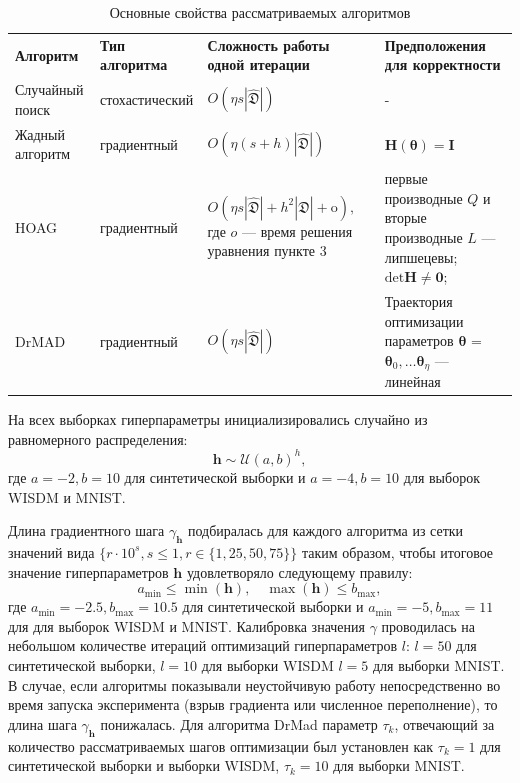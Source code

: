 \begin{table}
\small

\begin{tabularx}{\textwidth}{|X|X|X|X|}
\hline
\bf Алгоритм & \bf Тип алгоритма & \bf Сложность работы одной итерации & \bf Предположения для корректности  \\ 
Случайный поиск & стохастический & $O(\eta s |\hat{\mathfrak{D}}|)$& -  \\ \hline
Жадный алгоритм~\cite{greed_hyper} & градиентный & $O(\eta (s+h) |\hat{\mathfrak{D}}|)$ & $\mathbf{H}(\boldsymbol{\theta}) = \mathbf{I}$  \\ \hline
HOAG~\cite{hyper_hoag} & градиентный & $O(\eta s |\hat{\mathfrak{D}}| + h^2 |\hat{\mathfrak{D}}| + \text{o}),$ где $o$ --- время решения уравнения пункте 3&  первые производные $Q$ и вторые производные $L$ --- липшецевы;  $\text{det}\mathbf{H} \neq \mathbf{0}$;  \\ \hline
DrMAD~\cite{hyper_mad} & градиентный &$O(\eta s |\hat{\mathfrak{D}}|)$ & Траектория оптимизации параметров $\boldsymbol{\theta}$ = $\boldsymbol{\theta}_0, \dots \boldsymbol{\theta}_\eta$ --- линейная \\ \hline
\end{tabularx}

\caption{Основные свойства рассматриваемых алгоритмов}
\label{table:algo_descr}

\end{table}




На всех выборках гиперпараметры инициализировались случайно из равномерного распределения:
\[
    \mathbf{h} \sim \mathcal{U}(a,b)^h,
\]
где $a = -2, b = 10$ для синтетической выборки и $a = -4, b = 10$ для выборок WISDM и MNIST.

Длина градиентного шага $\gamma_{\mathbf{h}}$ подбиралась для каждого алгоритма из сетки значений вида $\{r \cdot 10^{s}, s \leq 1, r \in \{1,25,50,75\}\}$  таким образом, чтобы итоговое значение гиперпараметров  $\mathbf{h}$  удовлетворяло следующему правилу:
\[
    a_\text{min} \leq  \min(\mathbf{h}), \quad \max(\mathbf{h}) \leq b_\text{max},
\] 
где  $a_\text{min} = -2.5, b_\text{max}=10.5$ для синтетической выборки и $a_\text{min} = -5, b_\text{max}=11$ для для выборок WISDM и MNIST.
Калибровка значения $\gamma$ проводилась на небольшом количестве итераций оптимизаций гиперпараметров $l$:
$l = 50$ для синтетической выборки,  $l=10$ для выборки WISDM $l=5$ для выборки MNIST. В случае, если алгоритмы показывали неустойчивую работу непосредственно во время запуска эксперимента (взрыв градиента или численное переполнение), то длина шага $\gamma_\mathbf{h}$ понижалась. Для алгоритма DrMad параметр $\tau_k$, отвечающий за количество рассматриваемых шагов оптимизации был установлен как $\tau_k=1$ для синтетической выборки и выборки WISDM, $\tau_k=10$ для выборки MNIST.



